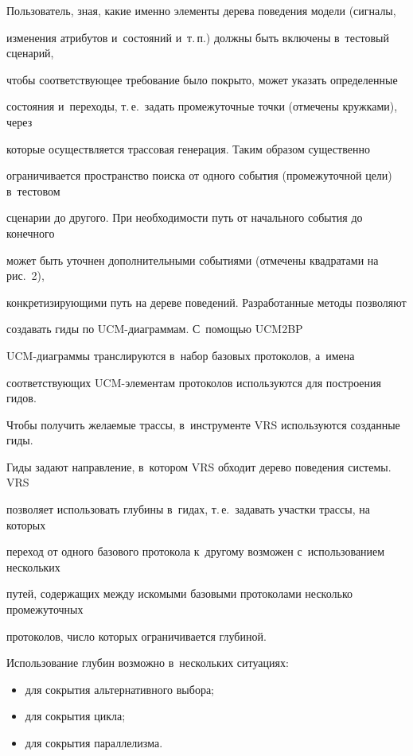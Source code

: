    Пользователь, зная, какие именно элементы дерева поведения модели (сигналы,


изменения атрибутов и~состояний и~т.\,п.) должны быть включены в~тестовый сценарий,


чтобы соответствующее требование было покрыто, может указать определенные


состояния и~переходы, т.\,е.\ задать промежуточные точки (отмечены кружками), через


которые осуществляется трассовая генерация. Таким образом существенно


ограничивается пространство поиска от одного события (промежуточной цели) в~тестовом


сценарии до другого. При необходимости путь от начального события до конечного


может быть уточнен дополнительными событиями (отмечены квадратами на рис.~2),


конкретизирующими путь на дереве поведений. Разработанные методы позволяют


создавать гиды по UCM-диа\-грам\-мам. С~помощью UCM2BP


   UCM-диа\-грам\-мы транслируются в~набор базовых протоколов, а~имена


соответствующих UCM-эле\-мен\-там протоколов используются для построения гидов.





   Чтобы получить желаемые трассы, в~инструменте VRS используются созданные гиды.


Гиды задают направление, в~котором VRS обходит дерево поведения системы. VRS


позволяет использовать глубины в~гидах, т.\,е.\ задавать участки трассы, на которых


переход от одного базового протокола к~другому возможен с~использованием нескольких


путей, содержащих между искомыми базовыми протоколами несколько промежуточных


протоколов, число которых ограничивается глубиной.





   Использование глубин возможно в~нескольких ситуациях:


   \begin{itemize}


\item для сокрытия альтернативного выбора;


\item для сокрытия цикла;


\item для сокрытия параллелизма.


\end{itemize}





